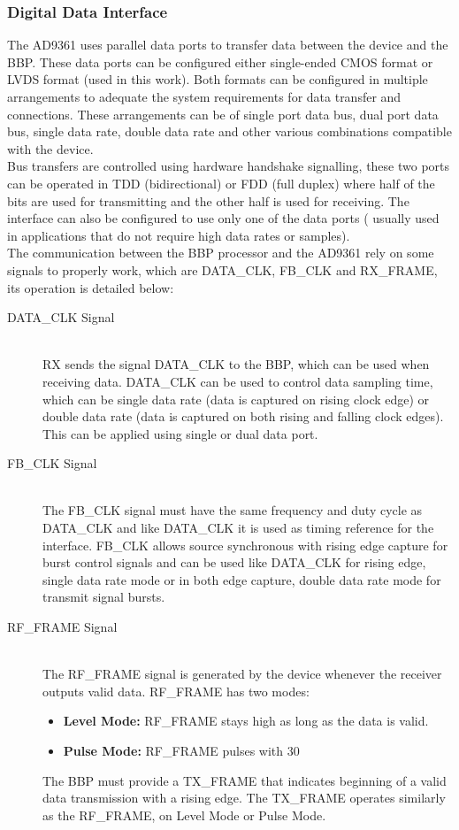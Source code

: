 \subsubsection{Digital Data Interface}

The AD9361 uses parallel data ports to transfer data between the device and the BBP. These data ports can be configured either single-ended CMOS format or LVDS format (used in this work). Both formats can be configured in multiple arrangements to adequate the system requirements for data transfer and connections. These arrangements can be of single port data bus, dual port data bus, single data rate, double data rate and other various combinations compatible with the device.\\
Bus transfers are controlled using hardware handshake signalling, these two ports can be operated in TDD (bidirectional) or FDD (full duplex) where half of the bits are used for transmitting and the other half is used for receiving. The interface can also be configured to use only one of the data ports ( usually used in applications that do not require high data rates or samples).\\
The communication between the BBP processor and the AD9361 rely on some signals to properly work, which are DATA\_CLK, FB\_CLK and RX\_FRAME, its operation is detailed below:

\begin{description}
	\item[DATA\_CLK Signal] \hfill \\
	RX sends the signal DATA\_CLK to the BBP, which can be used when receiving data. DATA\_CLK can be used to control data sampling time, which can be single data rate (data is captured on rising clock edge) or double data rate (data is captured on both rising and falling clock edges). This can be applied using single or dual data port.

	\item[FB\_CLK Signal] \hfill \\
	The FB\_CLK signal must have the same frequency and duty cycle as DATA\_CLK and like DATA\_CLK it is used as timing reference for the interface. FB\_CLK allows source synchronous with rising edge capture for burst control signals and can be used like DATA\_CLK for rising edge, single data rate mode or in both edge capture, double data rate mode for transmit signal bursts.

	\item[RF\_FRAME Signal] \hfill \\
	The RF\_FRAME signal is generated by the device whenever the receiver outputs valid data. RF\_FRAME has two modes:
	\begin{itemize}
		\item \textbf{Level Mode:} RF\_FRAME stays high as long as the data is valid.
		\item \textbf{Pulse Mode:} RF\_FRAME pulses with 30%
	\end{itemize}
	The BBP must provide a TX\_FRAME that indicates beginning of a valid data transmission with a rising edge. The TX\_FRAME operates similarly as the RF\_FRAME, on Level Mode or Pulse Mode.

\end{description}


